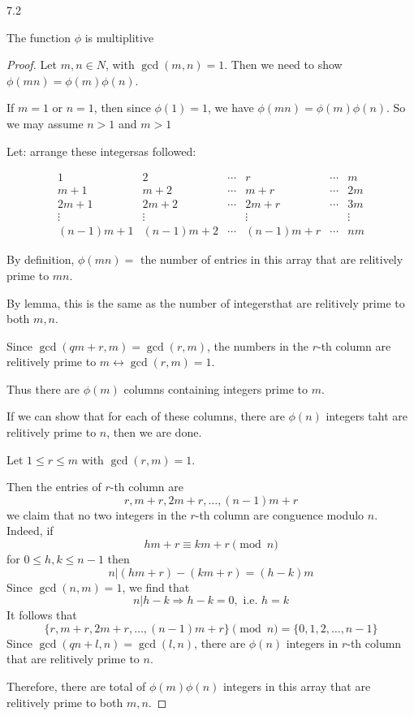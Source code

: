 \begin{theorem}
    7.2

    The function $\phi$ is multiplitive
\end{theorem}
\begin{proof}
    Let $m, n \in N$, with $\gcd(m, n) = 1$.
    Then we need to show $\phi(mn) = \phi(m) \phi(n)$.

    If $m = 1$ or $n = 1$, then since $\phi(1) = 1$,
    we have $\phi(mn) = \phi(m) \phi(n)$.
    So we may assume $n > 1$ and $m > 1$

    Let: arrange these integersas followed:

    \[
        \begin{matrix}
            1        & 2        & \cdots & r        & \cdots & m      \\
            m+1      & m+2      & \cdots & m+r      & \cdots & 2m     \\
            2m+1     & 2m+2     & \cdots & 2m+r     & \cdots & 3m     \\
            \vdots   & \vdots   &        & \vdots   &        & \vdots \\
            (n-1)m+1 & (n-1)m+2 & \cdots & (n-1)m+r & \cdots & nm
        \end{matrix}
    \]

    By definition, $\phi(mn) =$ the number of entries in this array that are relitively prime to $mn$.

    By lemma, this is the same as the number of integersthat are relitively prime to both $m, n$.

    Since $\gcd(qm+r, m) = \gcd(r, m)$, the numbers in the $r$-th column are relitively prime to $m \leftrightarrow \gcd(r, m) = 1$.

    Thus there are $\phi(m)$ columns containing integers prime to $m$.

    If we can show that for each of these columns, there are $\phi(n)$ integers taht are relitively prime to $n$, then we are done.

    Let $1 \leq r \leq m$ with $\gcd(r, m) = 1$.

    Then the entries of $r$-th column are
    \[
        r, m+r, 2m+r, \ldots, (n-1)m+r
    \]
    we claim that no two integers in the $r$-th column are conguence modulo $n$. Indeed, if
    \[
        hm + r \equiv km+r \pmod{n}
    \]
    for $0 \leq h, k \leq n-1$ then
    \[
        n | (hm+r) - (km+r) = (h-k)m
    \]
    Since $\gcd(n, m) = 1$, we find that
    \[
        n | h - k \Rightarrow h - k = 0, \text{ i.e. } h = k
    \]
    It follows that
    \[
        \{r, m+r, 2m+r, \ldots, (n-1)m+r\} \pmod{n}
        = \{0, 1, 2, \ldots, n-1\}
    \]
    Since $\gcd(qn+l, n) = \gcd(l, n)$, there are $\phi(n)$ integers in $r$-th column that are relitively prime to $n$.

    Therefore, there are total of $\phi(m)\phi(n)$ integers in this array that are relitively prime to both $m, n$.
\end{proof}


